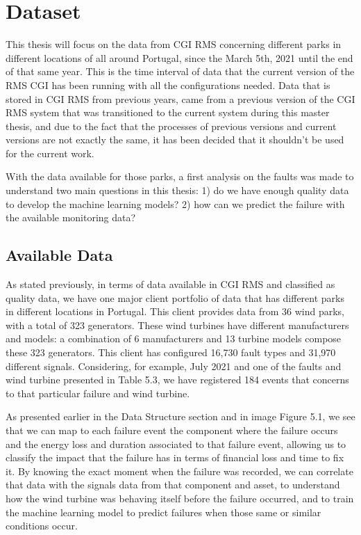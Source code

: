 \section{Dataset}
\label{sub:if_you_use_this_template} 
This thesis will focus on the data from CGI RMS concerning different parks in different locations of all around Portugal, since the March 5th, 2021 until the end of that same year. This is the time interval of data that the current version of the RMS CGI has been running with all the configurations needed. Data that is stored in CGI RMS from previous years, came from a previous version of the CGI RMS system that was transitioned to the current system during this master thesis, and due to the fact that the processes of previous versions and current versions are not exactly the same, it has been decided that it shouldn't be used for the current work.

With the data available for those parks, a first analysis on the faults was made to understand two main questions in this thesis: 1) do we have enough quality data to develop the machine learning models? 2) how can we predict the failure with the available monitoring data? 

\subsection{Available Data} 
\label{sub:if_you_use_this_template} 

As stated previously, in terms of data available in CGI RMS and classified as quality data, we have one major client portfolio of data that has different parks in different locations in Portugal. This client provides data from 36 wind parks, with a total of 323 generators. These wind turbines have different manufacturers and models: a combination of 6 manufacturers and 13 turbine models compose these 323 generators. This client has configured 16,730 fault types and 31,970 different signals.
Considering, for example, July 2021 and one of the faults and wind turbine presented in Table 5.3, we have registered 184 events that concerns to that particular failure and wind turbine.

As presented earlier in the Data Structure section and in image Figure 5.1, we see that we can map to each failure event the component where the failure occurs and the energy loss and duration associated to that failure event, allowing us to classify the impact that the failure has in terms of financial loss and time to fix it. By knowing the exact moment when the failure was recorded, we can correlate that data with the signals data from that component and asset, to understand how the wind turbine was behaving itself before the failure occurred, and to train the machine learning model to predict failures when those same or similar conditions occur.

